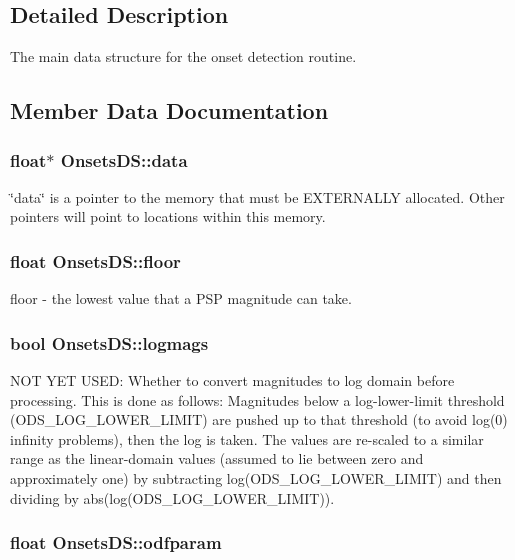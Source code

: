 \subsection{\-Detailed \-Description}
\-The main data structure for the onset detection routine. 

\subsection{\-Member \-Data \-Documentation}
\hypertarget{structOnsetsDS_aba9357b81e5bbaf2f5eec0b5cd6341f2}{
\subsubsection[{data}]{\setlength{\rightskip}{0pt plus 5cm}float$\ast$ {\bf \-Onsets\-D\-S\-::data}}}\label{structOnsetsDS_aba9357b81e5bbaf2f5eec0b5cd6341f2}
\char`\"{}data\char`\"{} is a pointer to the memory that must be \-E\-X\-T\-E\-R\-N\-A\-L\-L\-Y allocated. \-Other pointers will point to locations within this memory. \hypertarget{structOnsetsDS_a0c4f6f0751dca3301396169571a5e702}{
\subsubsection[{floor}]{\setlength{\rightskip}{0pt plus 5cm}float {\bf \-Onsets\-D\-S\-::floor}}}\label{structOnsetsDS_a0c4f6f0751dca3301396169571a5e702}
floor -\/ the lowest value that a \-P\-S\-P magnitude can take. \hypertarget{structOnsetsDS_a9570cf2143c45ca1651ebbe81f21199e}{
\subsubsection[{logmags}]{\setlength{\rightskip}{0pt plus 5cm}bool {\bf \-Onsets\-D\-S\-::logmags}}}\label{structOnsetsDS_a9570cf2143c45ca1651ebbe81f21199e}
\-N\-O\-T \-Y\-E\-T \-U\-S\-E\-D\-: \-Whether to convert magnitudes to log domain before processing. \-This is done as follows\-: \-Magnitudes below a log-\/lower-\/limit threshold (\-O\-D\-S\-\_\-\-L\-O\-G\-\_\-\-L\-O\-W\-E\-R\-\_\-\-L\-I\-M\-I\-T) are pushed up to that threshold (to avoid log(0) infinity problems), then the log is taken. \-The values are re-\/scaled to a similar range as the linear-\/domain values (assumed to lie between zero and approximately one) by subtracting log(\-O\-D\-S\-\_\-\-L\-O\-G\-\_\-\-L\-O\-W\-E\-R\-\_\-\-L\-I\-M\-I\-T) and then dividing by abs(log(\-O\-D\-S\-\_\-\-L\-O\-G\-\_\-\-L\-O\-W\-E\-R\-\_\-\-L\-I\-M\-I\-T)). \hypertarget{structOnsetsDS_ab42f8cdea87d089218e078442475edb0}{
\subsubsection[{odfparam}]{\setlength{\rightskip}{0pt plus 5cm}float {\bf \-Onsets\-D\-S\-::odfparam}}}\label{structOnsetsDS_ab42f8cdea87d089218e078442475edb0}
